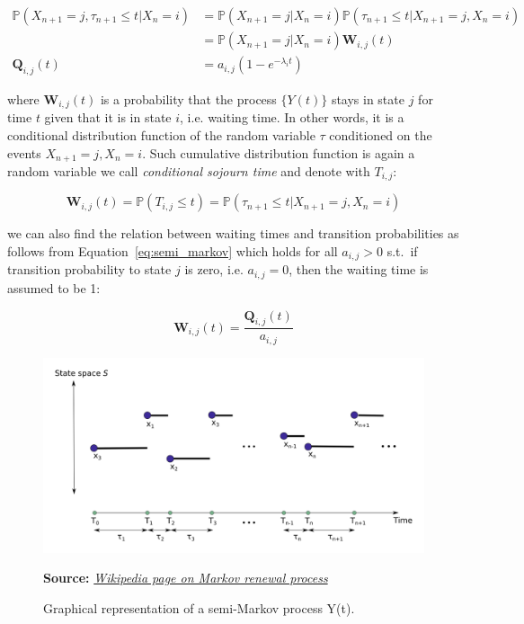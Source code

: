 \begin{align}
    \mathbb{P}(X_{n+1}=j, \tau_{n+1} \leq t|X_n=i) &= \mathbb{P}(X_{n+1}=j|X_n=i) \mathbb{P}(\tau_{n+1} \leq t|X_{n+1}=j, X_n=i) \\ 
                                                   &= \mathbb{P}(X_{n+1}=j|X_n=i) \textbf{W}_{i,j}(t) \\
                            \textbf{Q}_{i,j}(t)    &= a_{i,j} (1-e^{- \lambda_i t})
\end{align}

where $\textbf{W}_{i,j}(t)$ is a probability that the process $\{Y(t)\}$ stays in state $j$ for time $t$ given that it is in state $i$, i.e. waiting time. In other words, it is a conditional distribution function 
of the random variable $\tau$ conditioned on the events $X_{n+1}=j, X_n=i$. Such cumulative distribution function is again a random variable we call \textit{conditional sojourn time} and denote with $T_{i,j}$:

\begin{equation}
    \textbf{W}_{i,j}(t) = \mathbb{P}(T_{i,j} \leq t) = \mathbb{P}(\tau_{n+1} \leq t|X_{n+1}=j, X_n=i) 
\end{equation}

we can also find the relation between waiting times and transition probabilities as follows from Equation~\ref{eq:semi_markov} which holds for all $a_{i,j} > 0$ s.t.\ if transition probability to state $j$ is zero, 
i.e. $a_{i,j} = 0$, then the waiting time is assumed to be 1:

\begin{equation} \label{eq:semi_markov}
    \textbf{W}_{i,j}(t) = \frac{\textbf{Q}_{i,j}(t)}{a_{i,j}}
\end{equation}

\begin{figure}[htbp]
    \begin{center}
        \includegraphics[width=1.0\textwidth]{Figs/semi_markov.png}
        \caption*{\textbf{Source:} \href{https://en.wikipedia.org/wiki/Markov_renewal_process}{\textit{Wikipedia page on Markov renewal process}}}
        \caption[Diagram representation semi-Markov process]{Graphical representation of a semi-Markov process Y(t).}
        \label{fig:semi_markov}
    \end{center}
\end{figure}

